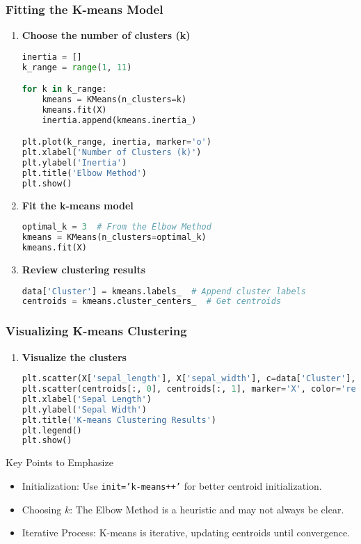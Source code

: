 \documentclass[aspectratio=169]{beamer}
\begin{document}
\begin{frame}[fragile]
    \frametitle{Fitting the K-means Model}
    \begin{enumerate}[resume]
        \item \textbf{Choose the number of clusters (k)}
        \begin{lstlisting}[language=Python]
inertia = []
k_range = range(1, 11)

for k in k_range:
    kmeans = KMeans(n_clusters=k)
    kmeans.fit(X)
    inertia.append(kmeans.inertia_)

plt.plot(k_range, inertia, marker='o')
plt.xlabel('Number of Clusters (k)')
plt.ylabel('Inertia')
plt.title('Elbow Method')
plt.show()
        \end{lstlisting}

        \item \textbf{Fit the k-means model}
        \begin{lstlisting}[language=Python]
optimal_k = 3  # From the Elbow Method
kmeans = KMeans(n_clusters=optimal_k)
kmeans.fit(X)
        \end{lstlisting}
        
        \item \textbf{Review clustering results}
        \begin{lstlisting}[language=Python]
data['Cluster'] = kmeans.labels_  # Append cluster labels
centroids = kmeans.cluster_centers_  # Get centroids
        \end{lstlisting}
    \end{enumerate}
\end{frame}

\begin{frame}[fragile]
    \frametitle{Visualizing K-means Clustering}
    \begin{enumerate}[resume]
        \item \textbf{Visualize the clusters}
        \begin{lstlisting}[language=Python]
plt.scatter(X['sepal_length'], X['sepal_width'], c=data['Cluster'], cmap='viridis')
plt.scatter(centroids[:, 0], centroids[:, 1], marker='X', color='red', s=200, label='Centroids')
plt.xlabel('Sepal Length')
plt.ylabel('Sepal Width')
plt.title('K-means Clustering Results')
plt.legend()
plt.show()
        \end{lstlisting}
    \end{enumerate}
    
    \begin{block}{Key Points to Emphasize}
        \begin{itemize}
            \item Initialization: Use \texttt{init='k-means++'} for better centroid initialization.
            \item Choosing \(k\): The Elbow Method is a heuristic and may not always be clear.
            \item Iterative Process: K-means is iterative, updating centroids until convergence.
        \end{itemize}
    \end{block}
\end{frame}
\end{document}
